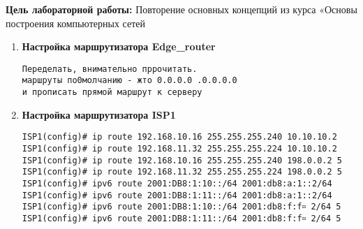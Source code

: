 \documentclass[a4paper,14pt]{extarticle}
\begin{document}
    \textbf{Цель лабораторной работы:}
    Повторение основных концепций из курса «Основы построения компьютерных сетей
    

    \begin{enumerate}
        \item \textbf{Настройка маршрутизатора Edge\_router}
        \begin{lstlisting}
Переделать, внимательно пррочитать.
маршруты по0молчанию - жто 0.0.0.0 .0.0.0.0 
и прописать прямой маршрут к серверу
        \end{lstlisting}
        \item \textbf{Настройка маршрутизатора ISP1}
        \begin{lstlisting}
ISP1(config)# ip route 192.168.10.16 255.255.255.240 10.10.10.2
ISP1(config)# ip route 192.168.11.32 255.255.255.224 10.10.10.2
ISP1(config)# ip route 192.168.10.16 255.255.255.240 198.0.0.2 5
ISP1(config)# ip route 192.168.11.32 255.255.255.224 198.0.0.2 5
ISP1(config)# ipv6 route 2001:DB8:1:10::/64 2001:db8:a:1::2/64
ISP1(config)# ipv6 route 2001:DB8:1:11::/64 2001:db8:a:1::2/64
ISP1(config)# ipv6 route 2001:DB8:1:10::/64 2001:db8:f:f። 2/64 5
ISP1(config)# ipv6 route 2001:DB8:1:11::/64 2001:db8:f:f። 2/64 5
        \end{lstlisting}
    \end{enumerate}
\end{document}
